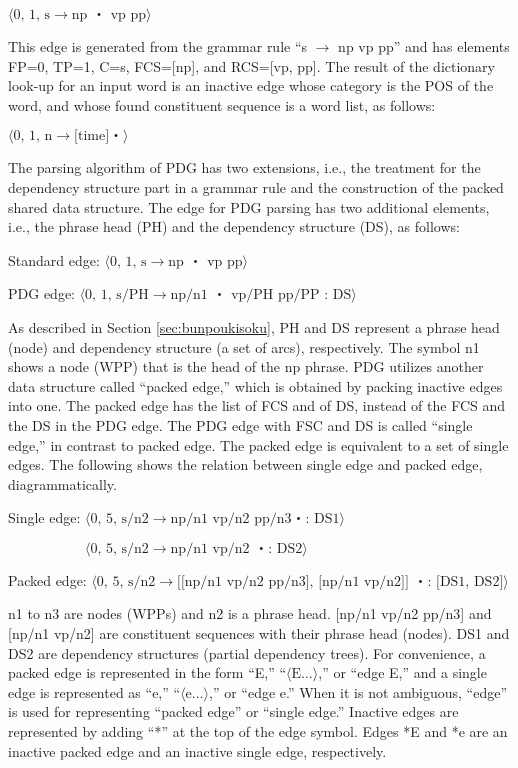 \documentclass[english]{jnlp_1.4_rep}
\theoremstyle{break}
\theoremstyle{plain}
\theoremstyle{plain}
\begin{document}
$\langle \text{0, 1, s} \rightarrow \text{np ・ vp pp} \rangle$

\noindent
This edge is generated from the grammar rule ``s
$\rightarrow$ np vp pp'' and has elements FP=0, TP=1, C=s, FCS=[np], and
RCS=[vp, pp]. The result of the dictionary look-up for an input word is
an inactive edge whose category is the POS of the word, and whose found
constituent sequence is a word list, as follows:

$\langle \text{0, 1, n} \rightarrow \text{[time]・} \rangle$

\noindent
The parsing algorithm of PDG has two extensions, i.e., the treatment for the dependency
structure part in a grammar rule and the construction of the packed
shared data structure. The edge for PDG parsing has two additional
elements, i.e., the phrase head (PH) and the dependency structure (DS),
as follows:

Standard edge: $\langle \text{0, 1, s} \rightarrow \text{np ・ vp pp}\rangle $

PDG edge: $\langle \text{0, 1, s/PH} \rightarrow \text{np/n1 ・ vp/PH pp/PP : DS} \rangle $

\noindent
As described in Section \ref{sec:bunpoukisoku}, PH and DS
represent a phrase head (node) and dependency structure (a set of
arcs), respectively. The symbol n1 shows a node (WPP) that is the head
of the np phrase. PDG utilizes another data structure called ``packed
edge,'' which is obtained by packing inactive edges into one. The
packed edge has the list of FCS and of DS, instead of the FCS
and the DS in the PDG edge. The PDG edge with FSC and DS is called
``single edge,'' in contrast to packed edge. The packed edge is
equivalent to a set of single edges. The following shows the relation
between single edge and packed edge, diagrammatically.

Single edge: $\langle \text{0, 5, s/n2} \rightarrow \text{np/n1 vp/n2 pp/n3・: DS1}\rangle $

$\phantom{\text{Single edge: }}\langle \text{0, 5, s/n2} \rightarrow \text{np/n1 vp/n2 ・: DS2} \rangle $

Packed edge: $\langle \text{0, 5, s/n2} \rightarrow \text{[[np/n1 vp/n2 pp/n3], [np/n1 vp/n2]] ・: [DS1, DS2]}\rangle $

\noindent
n1 to n3 are nodes (WPPs) and n2 is a phrase head. [np/n1
  vp/n2 pp/n3] and [np/n1 vp/n2] are constituent sequences with their
phrase head (nodes). DS1 and DS2 are dependency structures (partial
dependency trees). For convenience, a packed edge is represented in
the form ``E,'' ``$\langle \mathrm{E} \ldots \rangle$,'' or ``edge E,'' and a single
edge is represented as ``e,'' ``$\langle \mathrm{e} \ldots \rangle$,'' or ``edge e.''
When it is not ambiguous, ``edge'' is used for representing ``packed
edge'' or ``single edge.'' Inactive edges are represented by adding
``*'' at the top of the edge symbol. Edges *E and *e are an inactive packed
edge and an inactive single edge, respectively.
\end{document}
